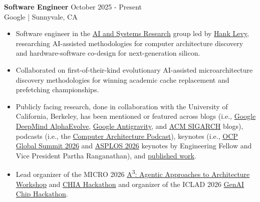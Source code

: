 \documentclass[line]{res}
\begin{document}
\begin{resume}
\textbf{Software Engineer} \hfill October 2025 - Present
\\
Google | Sunnyvale, CA
\\
\vspace{-3mm}
\begin{itemize}
\item Software engineer in the \href{https://techsysinfra.google/research/}{AI and Systems Research} group led by \href{https://techsysinfra.google/research/srg-staff/hank-levy/}{Hank Levy}, researching AI-assisted methodologies for computer architecture discovery and hardware-software co-design for next-generation silicon.
\item Collaborated on first-of-their-kind evolutionary AI-assisted microarchitecture discovery methodologies for winning academic cache replacement and prefetching championships.
\item Publicly facing research, done in collaboration with the University of California, Berkeley, has been mentioned or featured across blogs (i.e., \href{https://deepmind.google/blog/alphaevolve-impact/}{Google DeepMind AlphaEvolve}, \href{https://antigravity.google/blog/teamwork-when-ai-becomes-a-research-partner}{Google Antigravity}, and \href{https://www.sigarch.org/architecture-systems-are-changing-the-architects-role-in-the-era-of-agentic-co-design/}{ACM SIGARCH} blogs), podcasts (i.e., the \href{https://comparchpodcast.podbean.com/e/ep-24-from-unicorns-to-centaurs-co-designing-computer-systems-for-the-ai-era-with-dr-partha-ranganathan-google/}{Computer Architecture Podcast}), keynotes (i.e., \href{https://www.youtube.com/watch?v=3kJkux7t8VQ}{OCP Global Summit 2026} and \href{https://dl.acm.org/doi/10.1145/3779212.3795611}{ASPLOS 2026} keynotes by Engineering Fellow and Vice President Partha Ranganathan), and \hyperref[sec:pubs]{published work}.
\item Lead organizer of the MICRO 2026 \hyperref[sec:tutorialsworkshops]{A\textsuperscript{3}: Agentic Approaches to Architecture Workshop} and \hyperref[sec:tutorialsworkshops]{CHIA Hackathon} and organizer of the ICLAD 2026 \hyperref[sec:tutorialsworkshops]{GenAI Chip Hackathon}.
\end{itemize}

\vspace{-2mm}


\end{resume}
\end{document}
